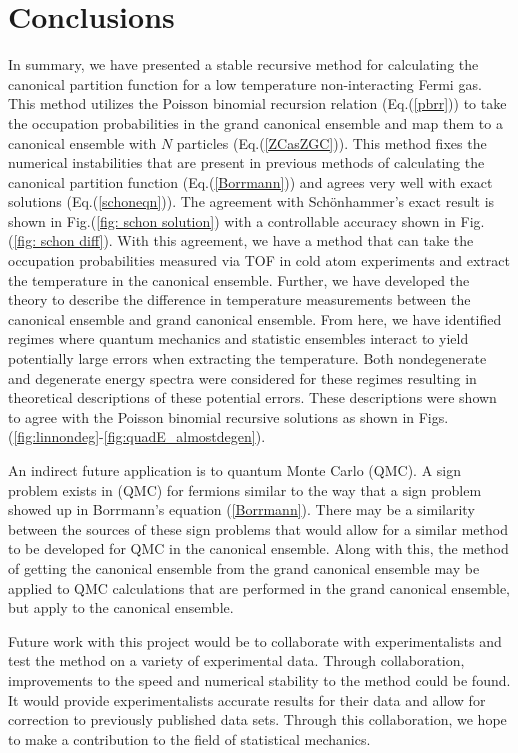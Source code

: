\chapter{Conclusions} \label{ch:conclusion}
In summary, we have presented a stable recursive method for calculating the canonical partition function for a low temperature non-interacting Fermi gas. This method utilizes the Poisson binomial recursion relation (Eq.\@ (\ref{pbrr})) to take the occupation probabilities in the grand canonical ensemble and map them to a canonical ensemble with $N$ particles (Eq.\@(\ref{ZCasZGC})). This method fixes the numerical instabilities that are present in previous methods of calculating the canonical partition function (Eq.\@ (\ref{Borrmann})) and agrees very well with exact solutions (Eq.\@ (\ref{schoneqn})). The agreement with Sch\"onhammer's exact result is shown in Fig.\@ (\ref{fig: schon solution}) with a controllable accuracy shown in Fig.\@ (\ref{fig: schon diff}). With this agreement, we have a method that can take the occupation probabilities measured via TOF in cold atom experiments and extract the temperature in the canonical ensemble. Further, we have developed the theory to describe the difference in temperature measurements between the canonical ensemble and grand canonical ensemble. From here, we have identified regimes where quantum mechanics and statistic ensembles interact to yield potentially large errors when extracting the temperature. Both nondegenerate and degenerate energy spectra were considered for these regimes resulting in theoretical descriptions of these potential errors. These descriptions were shown to agree with the Poisson binomial recursive solutions as shown in Figs. (\ref{fig:linnondeg}-\ref{fig:quadE_almostdegen}).

An indirect future application is to quantum Monte Carlo (QMC). A sign problem exists in (QMC) for fermions similar to the way that a sign problem showed up in Borrmann's equation (\ref{Borrmann}). There may be a similarity between the sources of these sign problems that would allow for a similar method to be developed for QMC in the canonical ensemble. Along with this, the method of getting the canonical ensemble from the grand canonical ensemble may be applied to QMC calculations that are performed in the grand canonical ensemble, but apply to the canonical ensemble. 

Future work with this project would be to collaborate with experimentalists and test the method on a variety of experimental data. Through collaboration, improvements to the speed and numerical stability to the method could be found. It would provide experimentalists accurate results for their data and allow for correction to previously published data sets. Through this collaboration, we hope to make a contribution to the field of statistical mechanics.